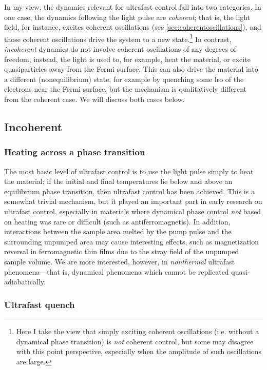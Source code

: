 In my view, the dynamics relevant for ultrafast control fall into two categories.
In one case, the dynamics following the light pulse are \emph{coherent}; that is, the light field, for instance, excites coherent oscillations (see \cref{sec:coherentoscillations}), and those coherent oscillations drive the system to a new state.\footnote{Here I take the view that simply exciting coherent oscillations (i.e. without a dynamical phase transition) is \emph{not} coherent control, but some may disagree with this point perspective, especially when the amplitude of such oscillations are large.}
In contrast, \emph{incoherent} dynamics do not involve coherent oscillations of any degrees of freedom; instead, the light is used to, for example, heat the material, or excite quasiparticles away from the Fermi surface.
This can also drive the material into a different (nonequilibrium) state, for example by quenching some \gls{lro} of the electrons near the Fermi surface, but the mechanism is qualitatively different from the coherent case.
We will discuss both cases below.

\subsection{Incoherent}

\subsubsection{Heating across a phase transition}

The most basic level of ultrafast control is to use the light pulse simply to heat the material; if the initial and final temperatures lie below and above an equilibrium phase transition, then ultrafast control has been achieved.
This is a somewhat trivial mechanism, but it played an important part in early research on ultrafast control, especially in materials where dynamical phase control \emph{not} based on heating was rare or difficult (such as antiferromagnetis\citep{kimel_laser-induced_2004}).
In addition, interactions between the sample area melted by the pump pulse and the surrounding unpumped area may cause interesting effects, such as magnetization reversal in ferromagnetic thin films due to the stray field of the unpumped sample volume\citep{ogasawara_submicron-scale_2009}.
We are more interested, however, in \emph{nonthermal} ultrafast phenomena---that is, dynamical phenomena which cannot be replicated quasi-adiabatically.

\subsubsection{Ultrafast quench}

